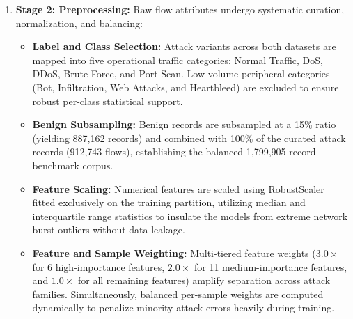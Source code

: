 \documentclass[12pt,a4paper]{report}
\begin{document}
\begin{enumerate}[leftmargin=*]
    \item \textbf{Stage 2: Preprocessing:} Raw flow attributes undergo systematic curation, normalization, and balancing:
    \begin{itemize}[leftmargin=*,itemsep=2pt,topsep=2pt]
        \item \textbf{Label and Class Selection:} Attack variants across both datasets are mapped into five operational traffic categories: Normal Traffic, DoS, DDoS, Brute Force, and Port Scan. Low-volume peripheral categories (Bot, Infiltration, Web Attacks, and Heartbleed) are excluded to ensure robust per-class statistical support.
        \item \textbf{Benign Subsampling:} Benign records are subsampled at a 15\% ratio (yielding 887,162 records) and combined with 100\% of the curated attack records (912,743 flows), establishing the balanced 1,799,905-record benchmark corpus.
        \item \textbf{Feature Scaling:} Numerical features are scaled using RobustScaler fitted exclusively on the training partition, utilizing median and interquartile range statistics to insulate the models from extreme network burst outliers without data leakage.
        \item \textbf{Feature and Sample Weighting:} Multi-tiered feature weights ($3.0\times$ for 6 high-importance features, $2.0\times$ for 11 medium-importance features, and $1.0\times$ for all remaining features) amplify separation across attack families. Simultaneously, balanced per-sample weights are computed dynamically to penalize minority attack errors heavily during training.
    \end{itemize}


\end{enumerate}
\end{document}
